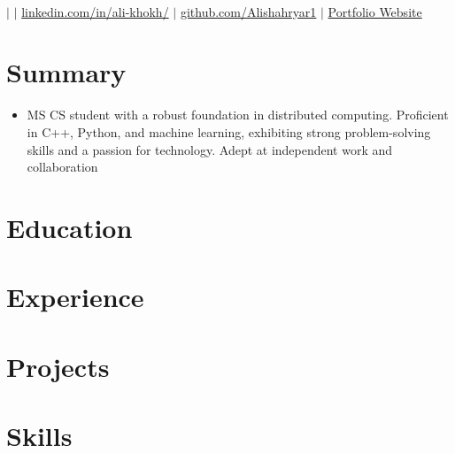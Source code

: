 \documentclass[letterpaper,11pt]{article}
\newcommand{\resumeItem}[1]{
  \item\small{
    {#1 \vspace{-2pt}}
  }
}
\newcommand{\resumeSubHeadingListStart}{\begin{itemize}[leftmargin=0.15in, label={}]}
\newcommand{\resumeSubHeadingListEnd}{\end{itemize}}
\begin{document}
\begin{center}
    \textbf{\Huge \scshape  } \\ \vspace{1pt} %
    \small  $|$ %
    \href{mailto:}{} $|$ %
    \href{https://www.linkedin.com/in/ali-khokh/}{linkedin.com/in/ali-khokh/} $|$ %
    \href{https://github.com/Alishahryar1}{github.com/Alishahryar1} $|$ %
    \href{https://alishahryar1.github.io/}{Portfolio Website} %
\end{center}
\section{Summary}
\resumeSubHeadingListStart
    \resumeItem{MS CS student with a robust foundation in distributed computing. Proficient in C++, Python, and machine learning, exhibiting strong problem-solving skills and a passion for technology. Adept at independent work and collaboration}
\resumeSubHeadingListEnd
\vspace{-10pt}
\section{Education}
  \resumeSubHeadingListStart
  \resumeSubHeadingListEnd
\section{Experience}
\resumeSubHeadingListStart
\resumeSubHeadingListEnd
\section{Projects}
    \resumeSubHeadingListStart
    \resumeSubHeadingListEnd
\section{Skills}
 \begin{itemize}[leftmargin=0.15in, label={}]
    \small{\item{
     }}
 \end{itemize}
\end{document}
